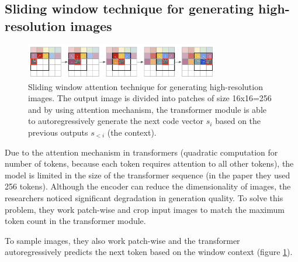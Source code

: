 \subsection{Sliding window technique for generating high-resolution images}

\begin{figure}[h]
    \centering
    \includegraphics[width=0.75\textwidth]{images/vqgan_sliding_attention.png}
    \caption{Sliding window attention technique for generating high-resolution images. The output image is divided into patches of size 16x16=256 and by using attention mechanism, the transformer module is able to autoregressively generate the next code vector $s_i$ based on the previous outputs $s_{<i}$ (the context).}
    \label{fig:vqgan_sliding_window}
\end{figure}

Due to the attention mechanism in transformers (quadratic computation for number of tokens, because each token requires attention to all other tokens), the model is limited in the size of the transformer sequence (in the paper they used 256 tokens). Although the encoder can reduce the dimensionality of images, the researchers noticed significant degradation in generation quality. To solve this problem, they work patch-wise and crop input images to match the maximum token count in the transformer module.

To sample images, they also work patch-wise and the transformer autoregressively predicts the next token based on the window context (figure \ref{fig:vqgan_sliding_window}).


